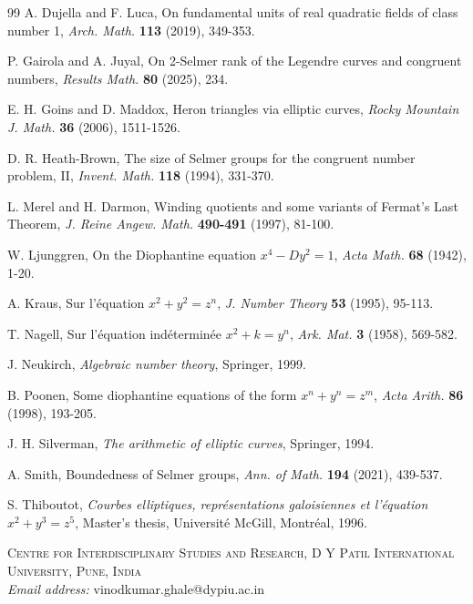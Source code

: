 \documentclass[10pt]{article}
\begin{document}
\begin{thebibliography}{99}
 A. Dujella and F. Luca, On fundamental units of real quadratic fields of class number 1, \textit{Arch. Math.} \textbf{113} (2019), 349-353.

 P. Gairola and A. Juyal, On 2-Selmer rank of the Legendre curves and congruent numbers, \textit{Results Math.} \textbf{80} (2025), 234.

 E. H. Goins and D. Maddox, Heron triangles via elliptic curves, \textit{Rocky Mountain J. Math.} \textbf{36} (2006), 1511-1526.

 D. R. Heath-Brown, The size of Selmer groups for the congruent number problem, II, \textit{Invent. Math.} \textbf{118} (1994), 331-370.

 L. Merel and H. Darmon, Winding quotients and some variants of Fermat's Last Theorem, \textit{J. Reine Angew. Math.} \textbf{490-491} (1997), 81-100.

 W. Ljunggren, On the Diophantine equation \(x^{4} - Dy^{2} = 1\), \textit{Acta Math.} \textbf{68} (1942), 1-20.

 A. Kraus, Sur l'équation \(x^{2} + y^{2} = z^{n}\), \textit{J. Number Theory} \textbf{53} (1995), 95-113.

 T. Nagell, Sur l'équation indéterminée \(x^{2} + k = y^{n}\), \textit{Ark. Mat.} \textbf{3} (1958), 569-582.

 J. Neukirch, \textit{Algebraic number theory}, Springer, 1999.

 B. Poonen, Some diophantine equations of the form \(x^{n} + y^{n} = z^{m}\), \textit{Acta Arith.} \textbf{86} (1998), 193-205.

 J. H. Silverman, \textit{The arithmetic of elliptic curves}, Springer, 1994.

 A. Smith, Boundedness of Selmer groups, \textit{Ann. of Math.} \textbf{194} (2021), 439-537.

 S. Thiboutot, \textit{Courbes elliptiques, représentations galoisiennes et l'équation \(x^{2} + y^{3} = z^{5}\)}, Master's thesis, Université McGill, Montréal, 1996.

\end{thebibliography}

\vspace{0.5cm}
\noindent\textsc{Centre for Interdisciplinary Studies and Research, D Y Patil International University, Pune, India}\\
\textit{Email address:} vinodkumar.ghale@dypiu.ac.in
\end{document}

